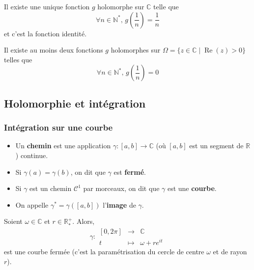 
  \begin{example}
    Il existe une unique fonction $g$ holomorphe sur $\mathbb{C}$ telle que
    \[ \forall n \in \mathbb{N}^*, \, g\left( \frac{1}{n} \right) = \frac{1}{n} \]
    et c'est la fonction identité.
  \end{example}

  \begin{cexample}
    Il existe au moins deux fonctions $g$ holomorphes sur $\Omega = \{ z \in \mathbb{C} \mid \operatorname{Re}(z) > 0 \}$ telles que
    \[ \forall n \in \mathbb{N}^*, \, g\left( \frac{1}{n} \right) = 0 \]
  \end{cexample}

  \subsection{Holomorphie et intégration}

  \subsubsection{Intégration sur une courbe}


  \begin{definition}
    \begin{itemize}
      \item Un \textbf{chemin} est une application $\gamma : [a,b] \rightarrow \mathbb{C}$ (où $[a,b]$ est un segment de $\mathbb{R}$) continue.
      \item Si $\gamma(a) = \gamma(b)$, on dit que $\gamma$ est \textbf{fermé}.
      \item Si $\gamma$ est un chemin $\mathcal{C}^1$ par morceaux, on dit que $\gamma$ est une \textbf{courbe}.
      \item On appelle $\gamma^* = \gamma([a,b])$ l'\textbf{image} de $\gamma$.
    \end{itemize}
  \end{definition}

  \begin{example}
    Soient $\omega \in \mathbb{C}$ et $r \in \mathbb{R}^+_*$. Alors,
    \[
      \gamma :
      \begin{array}{ccc}
        [0,2\pi] &\rightarrow& \mathbb{C} \\
        t &\mapsto& \omega + re^{it}
      \end{array}
    \]
    est une courbe fermée (c'est la paramétrisation du cercle de centre $\omega$ et de rayon $r$).
  \end{example}

